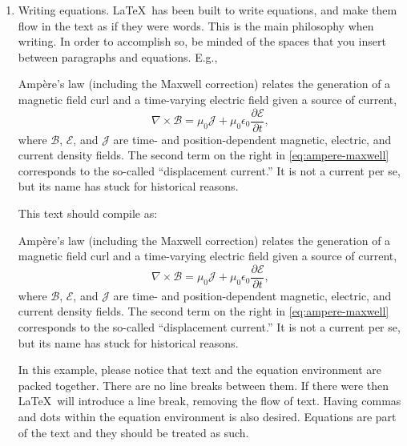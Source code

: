 \begin{enumerate}
  \item Writing equations. \LaTeX\ has been built to write equations, and make them flow in the text as if they were words. This is the main philosophy when writing. In order to accomplish so, be minded of the spaces that you insert between paragraphs and equations. E.g.,
  
  \begin{verbnobox}[\small]
    Ampère's law (including the Maxwell correction) relates the generation 
    of a magnetic field curl and a time-varying electric field given a 
    source of current,
    \begin{equation}
      \nabla \times \boldsymbol{\mathcal{B}} = 
      \mu_0 \boldsymbol{\mathcal{J}} + 
      \mu_0 \epsilon_0 \frac{\partial\boldsymbol{\mathcal{E}}}{\partial t},
    \end{equation}
    where $\boldsymbol{\mathcal{B}}$, $\boldsymbol{\mathcal{E}}$, 
    and $\boldsymbol{\mathcal{J}}$ are time- and position-dependent 
    magnetic, electric, and current density fields. 
    The second term on the right in 
    \cref{eq:ampere-maxwell} corresponds to the so-called 
    ``displacement current.'' It is not a current per se, but its name 
    has stuck for historical reasons.
  \end{verbnobox}
  
  This text should compile as:

  Ampère's law (including the Maxwell correction) relates the generation of a magnetic field curl and a time-varying electric field given a source of current,
  \begin{equation}
    \nabla \times \boldsymbol{\mathcal{B}} = \mu_0 \boldsymbol{\mathcal{J}} + \mu_0 \epsilon_0 \frac{\partial \boldsymbol{\mathcal{E}}}{\partial t}, \label{eq:ampere-maxwell}
  \end{equation}
  where $\boldsymbol{\mathcal{B}}$, $\boldsymbol{\mathcal{E}}$, and $\boldsymbol{\mathcal{J}}$ are time- and position-dependent magnetic, electric, and current density fields. The second term on the right in \cref{eq:ampere-maxwell} corresponds to the so-called ``displacement current.'' It is not a current per se, but its name has stuck for historical reasons.

  In this example, please notice that text and the equation environment are packed together. There are no line breaks between them. If there were then \LaTeX\ will introduce a line break, removing the flow of text. Having commas and dots within the equation environment is also desired. Equations are part of the text and they should be treated as such.
  

\end{enumerate}
